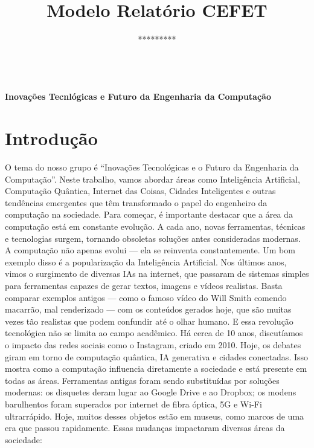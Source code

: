 \documentclass[12pt,a4paper]{article}
\author{*********} %
\makeatletter
\newcommand{\CEFETtitulo}[1]{
\begin{center}
\begin{Large}
\textbf{\\#1\\}
\end{Large}
\vspace{.5cm}
{\large \textbf{\@author}} %
\end{center}
\vspace{.5cm}
}
\newcommand{\CEFETopen}{
    \selectlanguage{brazilian}
    \pagestyle{otherpage}
    \thispagestyle{firstpage}
}
\makeatother
\begin{document}
    \title{Modelo Relatório CEFET} %
    \CEFETopen
    \CEFETtitulo{Inovações Tecnlógicas e Futuro da Engenharia da Computação}

    \section{Introdução}
      O tema do nosso grupo é “Inovações Tecnológicas e o Futuro da Engenharia da Computação”. Neste trabalho, vamos abordar áreas como Inteligência Artificial, Computação Quântica, Internet das Coisas, Cidades Inteligentes e outras tendências emergentes que têm transformado o papel do engenheiro da computação na sociedade.
    Para começar, é importante destacar que a área da computação está em constante evolução. A cada ano, novas ferramentas, técnicas e tecnologias surgem, tornando obsoletas soluções antes consideradas modernas. A computação não apenas evolui — ela se reinventa constantemente.
    Um bom exemplo disso é a popularização da Inteligência Artificial. Nos últimos anos, vimos o surgimento de diversas IAs na internet, que passaram de sistemas simples para ferramentas capazes de gerar textos, imagens e vídeos realistas. Basta comparar exemplos antigos — como o famoso vídeo do Will Smith comendo macarrão, mal renderizado — com os conteúdos gerados hoje, que são muitas vezes tão realistas que podem confundir até o olhar humano.
    E essa revolução tecnológica não se limita ao campo acadêmico. Há cerca de 10 anos, discutíamos o impacto das redes sociais como o Instagram, criado em 2010. Hoje, os debates giram em torno de computação quântica, IA generativa e cidades conectadas. Isso mostra como a computação influencia diretamente a sociedade e está presente em todas as áreas.
    Ferramentas antigas foram sendo substituídas por soluções modernas: os disquetes deram lugar ao Google Drive e ao Dropbox; os modens barulhentos foram superados por internet de fibra óptica, 5G e Wi-Fi ultrarrápido. Hoje, muitos desses objetos estão em museus, como marcos de uma era que passou rapidamente.
    Essas mudanças impactaram diversas áreas da sociedade:
\end{document}
